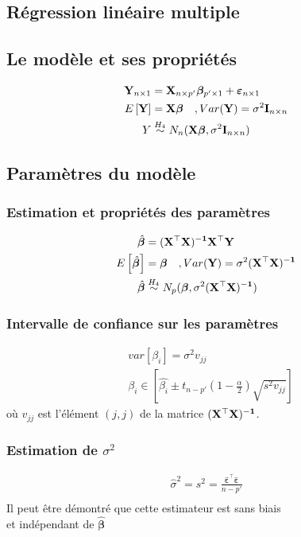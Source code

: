 \documentclass[10pt, french]{article}
\begin{document}
\begin{multicols*}{3}
\section{Régression linéaire multiple}
\subsection*{Le modèle et ses propriétés}
\begin{align*}
\mathbf{Y}_{n \times 1} & = \mathbf{X}_{n \times p'} \bm{\beta}_{p' \times 1} + \bm{\varepsilon}_{n \times 1} \\
E \left[ \mathbf{Y} \right]	& = \mathbf{X} \bm{\beta} \quad , Var(\mathbf{Y}) = \sigma^2 \mathbf{I}_{n \times n} \\
Y & \overset{H_4}{\sim} N_n(\mathbf{X} \bm{\beta}, \sigma^2 \mathbf{I}_{n \times n}) \\
\end{align*}

\subsection*{Paramètres du modèle}
\subsubsection*{Estimation et propriétés des paramètres}
\begin{align*}
\hat{\bm{\beta}} & = \mathbf{(X^\top X)^{-1} X^\top Y} \\
E \left[ \hat{\bm{\beta}} \right]	& = \bm{\beta} \quad , Var(\mathbf{Y}) = \sigma^2 (\mathbf{X^\top X)^{-1}} \\
\hat{\bm{\beta}} & \overset{H_4}{\sim} N_p(\bm{\beta}, \sigma^2 (\mathbf{X^\top X)^{-1}})
\end{align*}

\subsubsection*{Intervalle de confiance sur les paramètres}
\begin{align*}
&var[\beta_i] = \sigma^2 v_{jj} \\
&\beta_i \in \left[ \hat{\beta_i} \pm t_{n-p'}(1- \frac{\alpha}{2}) \sqrt{s^2 v_{jj}} \right]
\end{align*}
où $v_{jj}$ est l'élément $(j,j)$ de la matrice $\mathbf{(X^\top X)^{-1}}$.

\subsubsection*{Estimation de $\sigma^2$}
\begin{align*}
\hat{\sigma}^2 = s^2 = \frac{\hat{\bm{\varepsilon}}^\top \hat{\bm{\varepsilon}}}{n-p'} \\
\end{align*}
Il peut être démontré que cette estimateur est sans biais \\
et indépendant de $\bm{\hat{\beta}}$


\end{multicols*}
\end{document}
